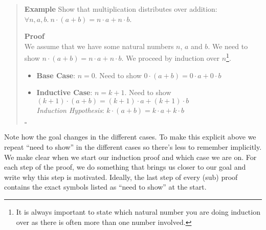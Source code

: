 \documentclass{tufte-handout}
\newcounter{example}
\newenvironment{example}
{\refstepcounter{example}\begin{quote}
\textbf{Example \arabic{example}}}
{

$\square$\end{quote}}
\begin{document}
\begin{example}\label{ex:distr}
  Show that multiplication distributes over addition:
  $\forall n,a,b.~n\cdot(a+b) = n\cdot a + n\cdot b$.

  \textbf{Proof}\\
  We assume that we have some natural numbers $n$, $a$ and $b$.
  We need to show $n\cdot(a+b) = n\cdot a + n\cdot b$.
  We proceed by induction over $n$\footnote{It is always important
    to state which natural number you are doing induction over as
    there is often more than one number involved. }.
  \begin{itemize}
  \item \textbf{Base Case}: $n = 0$. Need to show $0 \cdot (a + b) = 0 \cdot a + 0 \cdot b$
  \item \textbf{Inductive Case}: $n = k + 1$. Need to show
    $(k + 1) \cdot (a + b) = (k + 1) \cdot a + (k + 1) \cdot b$\\
    \textit{Induction Hypothesis}: $k \cdot (a + b) = k \cdot a + k \cdot b$
  \end{itemize}
\end{example}

\noindent
Note how the goal changes in the different cases. To make this
explicit above we repeat ``need to show'' in the different cases
so there's less to remember implicitly.
%
We make clear when we start our induction proof and which case we
are on. For each step of the proof, we do something that brings us
closer to our goal and write why this step is motivated. Ideally,
the last step of every (sub) proof contains the exact symbols
listed as ``need to show'' at the start.
\end{document}
